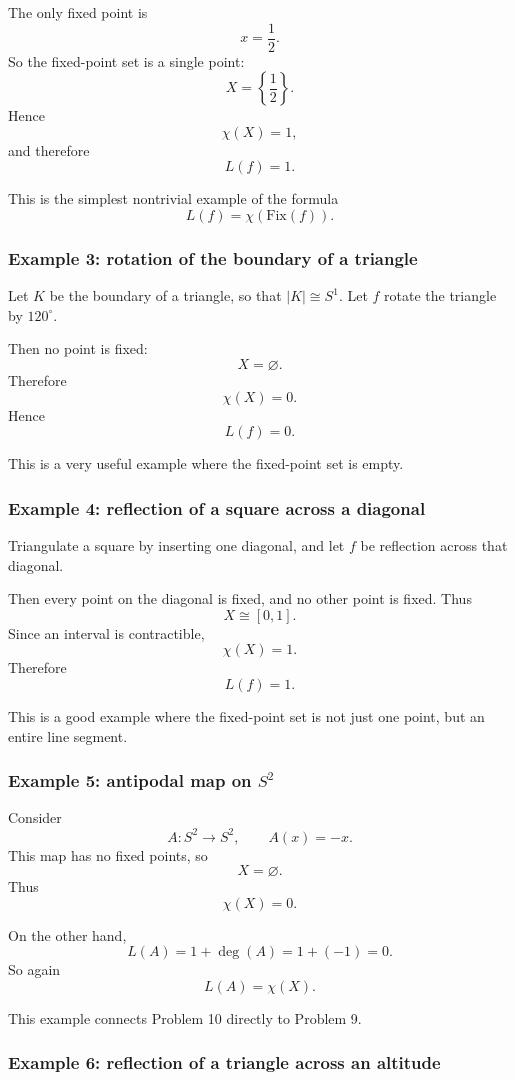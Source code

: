 \documentclass[12pt,a4paper]{article}
\theoremstyle{notespace}
\begin{document}
The only fixed point is
\[
x=\frac12.
\]
So the fixed-point set is a single point:
\[
X=\left\{\frac12\right\}.
\]
Hence
\[
\chi(X)=1,
\]
and therefore
\[
L(f)=1.
\]

This is the simplest nontrivial example of the formula
\[
L(f)=\chi(\mathrm{Fix}(f)).
\]

\subsubsection*{Example 3: rotation of the boundary of a triangle}

Let \(K\) be the boundary of a triangle, so that \(|K|\cong S^1\). Let \(f\) rotate the triangle by \(120^\circ\).

Then no point is fixed:
\[
X=\varnothing.
\]
Therefore
\[
\chi(X)=0.
\]
Hence
\[
L(f)=0.
\]

This is a very useful example where the fixed-point set is empty.

\subsubsection*{Example 4: reflection of a square across a diagonal}

Triangulate a square by inserting one diagonal, and let \(f\) be reflection across that diagonal.

Then every point on the diagonal is fixed, and no other point is fixed. Thus
\[
X\cong [0,1].
\]
Since an interval is contractible,
\[
\chi(X)=1.
\]
Therefore
\[
L(f)=1.
\]

This is a good example where the fixed-point set is not just one point, but an entire line segment.

\subsubsection*{Example 5: antipodal map on \(S^2\)}

Consider
\[
A:S^2\to S^2,\qquad A(x)=-x.
\]
This map has no fixed points, so
\[
X=\varnothing.
\]
Thus
\[
\chi(X)=0.
\]

On the other hand,
\[
L(A)=1+\deg(A)=1+(-1)=0.
\]
So again
\[
L(A)=\chi(X).
\]

This example connects Problem 10 directly to Problem 9.

\subsubsection*{Example 6: reflection of a triangle across an altitude}
\end{document}
